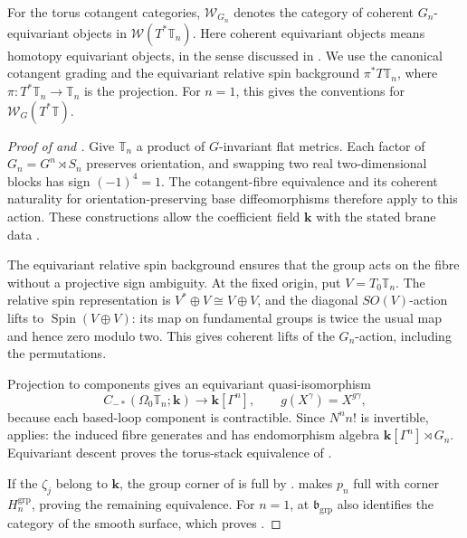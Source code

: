 \documentclass[a4paper]{amsart}
\newcommand{\kk}{\mathbf{k}}
\numberwithin{equation}{section}
\begin{document}
For the torus cotangent categories, $\mathcal W_{G_n}$ denotes the
category of coherent $G_n$-equivariant objects in
$\mathcal W(T^*\mathbb{T}_n)$. Here coherent equivariant objects means
homotopy equivariant objects, in the sense discussed in
\cite[Section~6.1]{AurouxSmith}. We use the canonical cotangent grading
and the equivariant relative spin background $\pi^*T\mathbb{T}_n$,
where $\pi:T^*\mathbb{T}_n\to\mathbb{T}_n$ is the projection.
For $n=1$, this gives the conventions for $\mathcal W_G(T^*\mathbb{T})$.

\begin{proof}[Proof of  and ]
Give $\mathbb{T}_n$ a product of $G$-invariant flat metrics. Each factor
of $G_n=G^n\rtimes S_n$ preserves orientation, and swapping two
real two-dimensional blocks has sign $(-1)^4=1$.
The cotangent-fibre equivalence \cite{AbouzaidFibre,AbouzaidLoops}
and its coherent naturality for orientation-preserving base
diffeomorphisms \cite[Theorems~1.0.12 and~6.0.1]{OhTanaka}
therefore apply to this action. These constructions allow the
coefficient field $\kk$ with the stated brane data
\cite[Choice~1.2.1]{OhTanaka}.

The equivariant relative spin background ensures that the group
acts on the fibre without a projective sign ambiguity. At the
fixed origin, put $V=T_0\mathbb{T}_n$. The relative spin
representation is $V^*\oplus V\cong V\oplus V$, and the diagonal
$SO(V)$-action lifts to $\operatorname{Spin}(V\oplus V)$:
its map on fundamental groups is twice the usual map and hence
zero modulo two. This gives coherent lifts of the $G_n$-action,
including the permutations.

Projection to components gives an equivariant quasi-isomorphism
\[
 C_{-*}(\Omega_0\mathbb{T}_n;\kk)\longrightarrow\kk[\Gamma^n],
 \qquad g(X^\gamma)=X^{g\gamma},
\]
because each based-loop component is contractible. Since $N^n n!$
is invertible,
 applies: the induced fibre generates
and has endomorphism algebra $\kk[\Gamma^n]\rtimes G_n$.
Equivariant descent proves the torus-stack equivalence of
.

If the $\zeta_j$ belong to $\kk$, the group corner of
 is full by .
 makes $p_n$ full with corner
$H_n^{\mathrm{grp}}$, proving the remaining equivalence.
For $n=1$,  at $\mathfrak b_{\mathrm{grp}}$
also identifies the category of the smooth surface, which proves
.
\end{proof}
\end{document}
